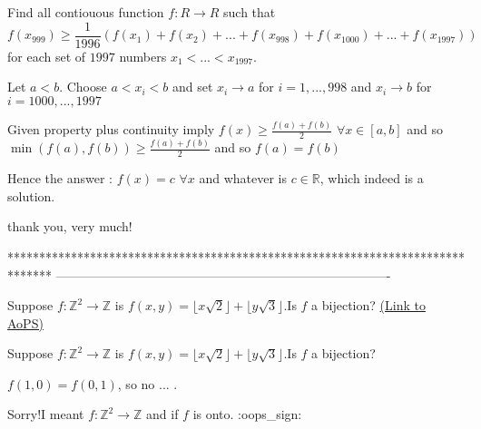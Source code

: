 \begin{solution}
	\begin{tcolorbox}Find  all contiouous  function $f:R \rightarrow R$  such that \[ f(x_{999})\ge \frac{1}{1996}(f(x_1)+f(x_2)+...+f(x_{998})+f(x_{1000}) +...+f(x_{1997}))  \]
for each set of $1997$ numbers $ x_1< ...< x_{1997} $.\end{tcolorbox}
Let $a<b$. Choose $a<x_i<b$ and set $x_i\to a$ for $i=1,...,998$ and $x_i\to b$ for $i=1000,...,1997$

Given property plus continuity imply $f(x)\ge \frac{f(a)+f(b)}2$ $\forall x\in[a,b]$ and so ${\min(f(a),f(b))\ge \frac{f(a)+f(b)}2}$ and so $f(a)=f(b)$

Hence the answer : $\boxed{f(x)=c}$ $\forall x$ and whatever is $c\in\mathbb R$, which indeed is a solution.
\end{solution}



\begin{solution}
	thank you, very much!
\end{solution}
*******************************************************************************
-------------------------------------------------------------------------------

\begin{problem}
	Suppose $f:\mathbb{Z}^{2}\rightarrow\mathbb{Z}$ is $f(x,y)=\lfloor{x}\sqrt{2}\rfloor+\lfloor{y}\sqrt{3}\rfloor$.Is $f$ a bijection?
	\flushright \href{https://artofproblemsolving.com/community/c6h534507}{(Link to AoPS)}
\end{problem}



\begin{solution}
	\begin{tcolorbox}Suppose $f:\mathbb{Z}^{2}\rightarrow\mathbb{Z}$ is $f(x,y)=\lfloor{x}\sqrt{2}\rfloor+\lfloor{y}\sqrt{3}\rfloor$.Is $f$ a bijection?\end{tcolorbox}
$f(1,0)=f(0,1)$, so no ... .
\end{solution}



\begin{solution}
	Sorry!I meant $f:\mathbb{Z}^{2}\rightarrow\mathbb{Z}$ and if $f$ is onto. :oops_sign:
\end{solution}



